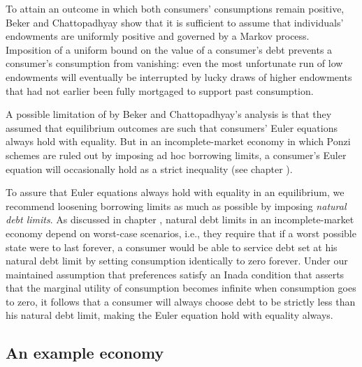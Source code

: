 To attain an outcome in which both consumers' consumptions remain positive,
Beker and Chattopadhyay  show that it is sufficient to assume
that individuals' endowments are uniformly
positive and governed by a Markov process. Imposition  of a uniform bound on the
value of a consumer's debt prevents a
consumer's consumption from vanishing:  even the most unfortunate run of
low endowments will eventually be interrupted
by  lucky draws of higher endowments that
had not earlier been fully mortgaged to support past
consumption.

A possible limitation of by Beker and
Chattopadhyay's  analysis  is that they assumed that equilibrium outcomes are such that
consumers' Euler
equations always hold with equality. But   in
an incomplete-market economy  in which  Ponzi schemes
are ruled out by imposing ad hoc borrowing limits, a consumer's Euler equation will occasionally hold as a strict inequality (see chapter ).

To assure that Euler equations always hold with equality in  an
equilibrium, we recommend  loosening borrowing limits as much as possible by
imposing {\it natural debt limits}. As discussed in chapter
, natural debt limits in an incomplete-market
economy depend  on worst-case scenarios, i.e., they require  that  if
a worst possible state were to last forever, a consumer
would be able to  service  debt set at his
natural debt limit by setting  consumption identically to zero forever. Under
our maintained assumption that preferences satisfy an Inada
condition that asserts that the marginal utility of consumption becomes
infinite when consumption goes to zero, it follows that a consumer
will always choose debt to be  strictly less than
his natural debt limit, making the Euler equation
 hold with equality always.



\subsection{An example economy}

